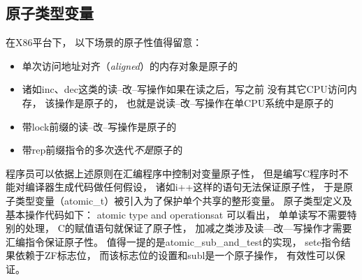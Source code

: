 \subsection{原子类型变量}
在X86平台下，
以下场景的原子性值得留意：
\begin{itemize}
  \item 单次访问地址对齐（{\it aligned}）的内存对象是原子的
  \item 诸如inc、dec这类的读--改--写操作如果在读之后，写之前%
    没有其它CPU访问内存，
    该操作是原子的，
    也就是说读--改--写操作在单CPU系统中是原子的
  \item 带lock前缀的读--改--写操作是原子的
  \item 带rep前缀指令的多次迭代{\em 不是}原子的
\end{itemize}
程序员可以依据上述原则在汇编程序中控制对变量原子性，
但是编写C程序时不能对编译器生成代码做任何假设，
诸如i++这样的语句无法保证原子性，
于是原子类型变量（atomic\_t）被引入为了保护单个共享的整形变量。
原子类型定义及基本操作代码如下：
              {atomic type and operations}{at}
可以看出，
单单读写不需要特别的处理，
C的赋值语句就保证了原子性，
加减之类涉及读—改—写操作才需要汇编指令保证原子性。
值得一提的是atomic\_sub\_and\_test的实现，
sete指令结果依赖于ZF标志位，
而该标志位的设置和subl是一个原子操作，
有效性可以保证。

